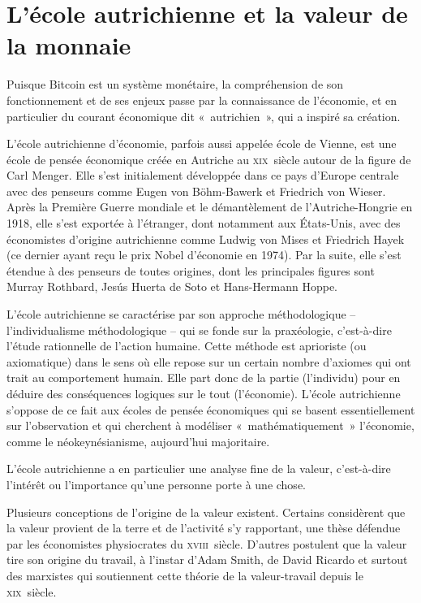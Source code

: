 \section*{L'école autrichienne et la valeur de la monnaie}

Puisque Bitcoin est un système monétaire, la compréhension de son fonctionnement et de ses enjeux passe par la connaissance de l'économie, et en particulier du courant économique dit «~autrichien~», qui a inspiré sa création. 

L'école autrichienne d'économie, parfois aussi appelée école de Vienne, est une école de pensée économique créée en Autriche au \textsc{xix}\ieme{}~siècle autour de la figure de Carl Menger. Elle s'est initialement développée dans ce pays d'Europe centrale avec des penseurs comme Eugen von Böhm-Bawerk et Friedrich von Wieser. Après la Première Guerre mondiale et le démantèlement de l'Autriche-Hongrie en 1918, elle s'est exportée à l'étranger, dont notamment aux États-Unis, avec des économistes d'origine autrichienne comme Ludwig von Mises et Friedrich Hayek (ce dernier ayant reçu le prix Nobel d'économie en 1974). Par la suite, elle s'est étendue à des penseurs de toutes origines, dont les principales figures sont Murray Rothbard, Jesús Huerta de Soto et Hans-Hermann Hoppe.

L'école autrichienne se caractérise par son approche méthodologique -- l'individualisme méthodologique -- qui se fonde sur la praxéologie, c'est-à-dire l'étude rationnelle de l'action humaine. Cette méthode est aprioriste (ou axiomatique) dans le sens où elle repose sur un certain nombre d'axiomes qui ont trait au comportement humain. Elle part donc de la partie (l'individu) pour en déduire des conséquences logiques sur le tout (l'économie). L'école autrichienne s'oppose de ce fait aux écoles de pensée économiques qui se basent essentiellement sur l'observation et qui cherchent à modéliser «~mathématiquement~» l'économie, comme le néokeynésianisme, aujourd'hui majoritaire.


L'école autrichienne a en particulier une analyse fine de la valeur, c'est-à-dire l'intérêt ou l'importance qu'une personne porte à une chose.

Plusieurs conceptions de l'origine de la valeur existent. Certains considèrent que la valeur provient de la terre et de l'activité s'y rapportant, une thèse défendue par les économistes physiocrates du \textsc{xviii}\ieme{}~siècle. D'autres postulent que la valeur tire son origine du travail, à l'instar d'Adam Smith, de David Ricardo et surtout des marxistes qui soutiennent cette théorie de la valeur-travail depuis le \textsc{xix}\ieme{}~siècle.

